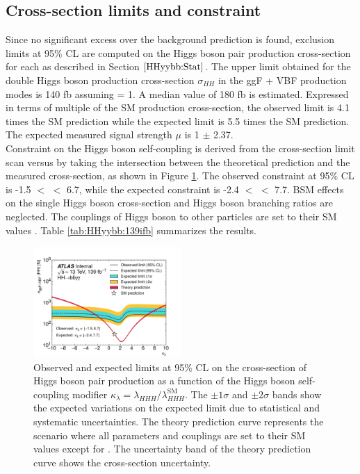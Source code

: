 \subsection{Cross-section limits and \kl constraint}
\label{HHyybb:Results:Xsec}
 Since no significant excess over the background prediction is found, exclusion limits at 95\% CL are computed on the Higgs boson pair production cross-section for each \kl as described in Section $\ref{HHyybb:Stat}$. The upper limit obtained for the double Higgs boson production cross-section $\sigma_{HH}$ in the ggF + VBF production modes is 140 fb assuming \kl = 1. A median value of 180 fb is estimated. Expressed in terms of multiple of the SM production cross-section, the observed limit is 4.1 times the SM prediction while the expected limit is 5.5 times the SM prediction. The expected measured signal strength $\mu$ is 1 $\pm$ 2.37.\\
Constraint on the Higgs boson self-coupling is derived from the cross-section limit scan versus \kl by taking the intersection between the theoretical prediction and the measured cross-section, as shown in Figure \ref{fig:HHyybb:Results:Xsec:Limit}. The observed constraint at 95\% CL is -1.5 $<$ \kl $<$ 6.7, while the expected constraint is -2.4 $<$ \kl $<$ 7.7. BSM effects on the single Higgs boson cross-section and Higgs boson branching ratios are neglected. The couplings of Higgs boson to other particles are set to their SM values \cite{Higgs_80ifb}. Table \ref{tab:HHyybb:139ifb} summarizes the results. 
\begin{figure}[htbp]
    \centering
    \includegraphics[width=0.5\textwidth]{Ch5/Img/figures_Results_kappa_lambda_scan.pdf}
    \caption{Observed and expected limits at 95\% CL on the cross-section of Higgs boson pair production as a function of the Higgs boson self-coupling modifier $\kappa_{\lambda}= \lambda_{HHH}/\lambda^{\textrm{SM}}_{HHH}$. The $\pm 1\sigma$ and $\pm 2\sigma$ bands show the expected variations on the expected limit due to statistical and systematic uncertainties. The theory prediction curve represents the scenario where all parameters and couplings are set to their SM values except for \kl. The uncertainty band of the theory prediction curve shows the cross-section uncertainty.}
    \label{fig:HHyybb:Results:Xsec:Limit}
\end{figure}
